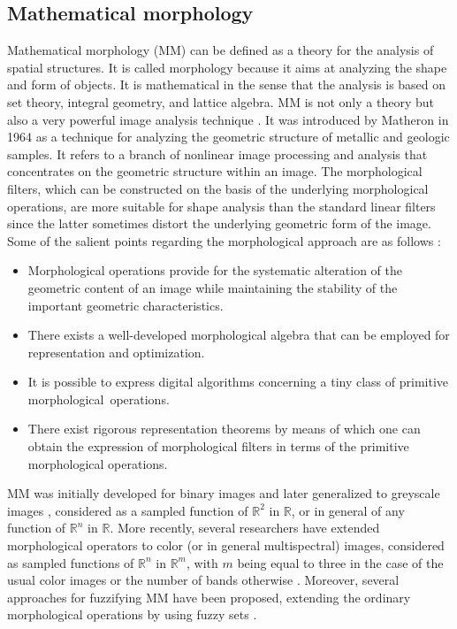 \subsection{Mathematical morphology} %
Mathematical morphology (MM) can be defined as a theory for the analysis of spatial structures. It is called morphology because it aims at analyzing the shape and form of objects. It is mathematical in the sense that the analysis is based on set theory, integral geometry, and lattice algebra. MM is not only a theory but also a very powerful image analysis technique \cite{Soille2004}.
It was introduced by Matheron in 1964 as a technique for analyzing the geometric structure of metallic and geologic samples. It refers to a branch of nonlinear image processing and analysis that concentrates on the geometric structure within an image.
The morphological filters, which can be constructed on the basis of the underlying morphological operations, are more suitable for shape analysis than the standard linear filters since the latter sometimes distort the underlying geometric form of the image. Some of the salient points regarding the morphological approach are as follows \cite{Giardina1988}:
\begin{itemize}
	\item Morphological operations provide for the systematic alteration of the geometric content of an image while maintaining the stability of the important geometric characteristics.
	\item There exists a well-developed morphological algebra that can be employed for representation and optimization.
	\item It is possible to express digital algorithms concerning a tiny class of primitive morphological~operations.
	\item There exist rigorous representation theorems by means of which one can obtain the expression of morphological filters in terms of the primitive morphological operations.
\end{itemize}

MM was initially developed for binary images and later generalized to greyscale images \cite{Soille2004, Serra1984}, considered as a sampled function of $\mathbb{R}^{2}$ in $\mathbb{R}$, or in general of any function of $\mathbb{R}^{n}$ in $\mathbb{R}$.
More recently, several researchers have extended morphological operators to color (or in general multispectral) images, considered as sampled functions of $\mathbb{R}^{n}$ in $\mathbb{R}^{m}$, with $m$ being equal to three in the case of the usual color images or the number of bands otherwise \cite{Benavent2012}.  Moreover, several approaches for fuzzifying MM have been proposed, extending the ordinary morphological operations by using fuzzy sets \cite{Kerre2000}.


